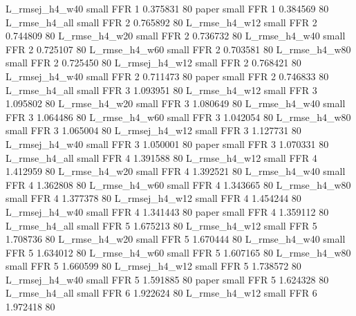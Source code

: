 L_rmsej_h4_w40      small      FFR                 1 0.375831 80
         paper      small      FFR                 1 0.384569 80
 L_rmse_h4_all      small      FFR                 2 0.765892 80
 L_rmse_h4_w12      small      FFR                 2 0.744809 80
 L_rmse_h4_w20      small      FFR                 2 0.736732 80
 L_rmse_h4_w40      small      FFR                 2 0.725107 80
 L_rmse_h4_w60      small      FFR                 2 0.703581 80
 L_rmse_h4_w80      small      FFR                 2 0.725450 80
L_rmsej_h4_w12      small      FFR                 2 0.768421 80
L_rmsej_h4_w40      small      FFR                 2 0.711473 80
         paper      small      FFR                 2 0.746833 80
 L_rmse_h4_all      small      FFR                 3 1.093951 80
 L_rmse_h4_w12      small      FFR                 3 1.095802 80
 L_rmse_h4_w20      small      FFR                 3 1.080649 80
 L_rmse_h4_w40      small      FFR                 3 1.064486 80
 L_rmse_h4_w60      small      FFR                 3 1.042054 80
 L_rmse_h4_w80      small      FFR                 3 1.065004 80
L_rmsej_h4_w12      small      FFR                 3 1.127731 80
L_rmsej_h4_w40      small      FFR                 3 1.050001 80
         paper      small      FFR                 3 1.070331 80
 L_rmse_h4_all      small      FFR                 4 1.391588 80
 L_rmse_h4_w12      small      FFR                 4 1.412959 80
 L_rmse_h4_w20      small      FFR                 4 1.392521 80
 L_rmse_h4_w40      small      FFR                 4 1.362808 80
 L_rmse_h4_w60      small      FFR                 4 1.343665 80
 L_rmse_h4_w80      small      FFR                 4 1.377378 80
L_rmsej_h4_w12      small      FFR                 4 1.454244 80
L_rmsej_h4_w40      small      FFR                 4 1.341443 80
         paper      small      FFR                 4 1.359112 80
 L_rmse_h4_all      small      FFR                 5 1.675213 80
 L_rmse_h4_w12      small      FFR                 5 1.708736 80
 L_rmse_h4_w20      small      FFR                 5 1.670444 80
 L_rmse_h4_w40      small      FFR                 5 1.634012 80
 L_rmse_h4_w60      small      FFR                 5 1.607165 80
 L_rmse_h4_w80      small      FFR                 5 1.660599 80
L_rmsej_h4_w12      small      FFR                 5 1.738572 80
L_rmsej_h4_w40      small      FFR                 5 1.591885 80
         paper      small      FFR                 5 1.624328 80
 L_rmse_h4_all      small      FFR                 6 1.922624 80
 L_rmse_h4_w12      small      FFR                 6 1.972418 80
